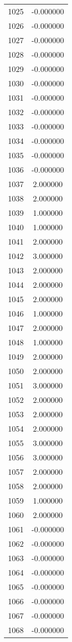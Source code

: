 \documentclass[12pt]{article}
\begin{document}
\begin{longtable}{@{}cc@{}}
1025 & -0.000000 \\
1026 & -0.000000 \\
1027 & -0.000000 \\
1028 & -0.000000 \\
1029 & -0.000000 \\
1030 & -0.000000 \\
1031 & -0.000000 \\
1032 & -0.000000 \\
1033 & -0.000000 \\
1034 & -0.000000 \\
1035 & -0.000000 \\
1036 & -0.000000 \\
1037 & 2.000000 \\
1038 & 2.000000 \\
1039 & 1.000000 \\
1040 & 1.000000 \\
1041 & 2.000000 \\
1042 & 3.000000 \\
1043 & 2.000000 \\
1044 & 2.000000 \\
1045 & 2.000000 \\
1046 & 1.000000 \\
1047 & 2.000000 \\
1048 & 1.000000 \\
1049 & 2.000000 \\
1050 & 2.000000 \\
1051 & 3.000000 \\
1052 & 2.000000 \\
1053 & 2.000000 \\
1054 & 2.000000 \\
1055 & 3.000000 \\
1056 & 3.000000 \\
1057 & 2.000000 \\
1058 & 2.000000 \\
1059 & 1.000000 \\
1060 & 2.000000 \\
1061 & -0.000000 \\
1062 & -0.000000 \\
1063 & -0.000000 \\
1064 & -0.000000 \\
1065 & -0.000000 \\
1066 & -0.000000 \\
1067 & -0.000000 \\
1068 & -0.000000 \\

\end{longtable}
\end{document}
